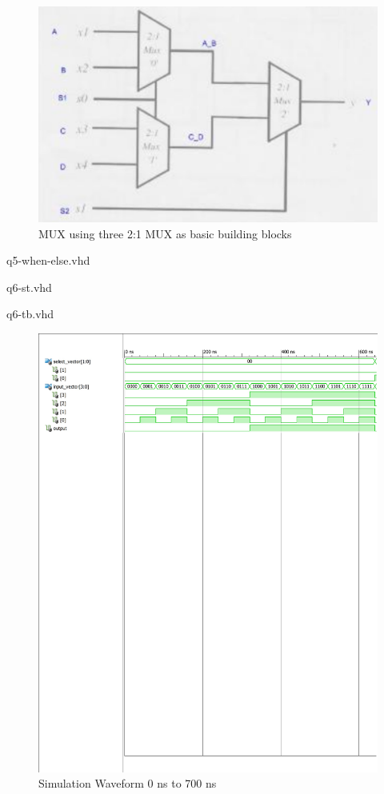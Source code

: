 \documentclass{article}
\begin{document}
\begin{figure}[H]
    \centering
    \includegraphics[scale=0.5,cframe=blue 0.5pt 3pt]{6.jpg}
    \caption{  MUX using three 2:1 MUX as basic building blocks }
\end{figure}


\HRule
{} {q5-when-else.vhd}
\HRule


\HRule
{} {q6-st.vhd}
\HRule


\HRule
{} {q6-tb.vhd}
\HRule




\begin{figure}[H]
    \centering
    \includegraphics[scale=0.75,cframe=blue 0.5pt 3pt]{6aw-1.pdf}
    \caption{Simulation Waveform 0 ns to 700 ns  }
\end{figure}
\end{document}
